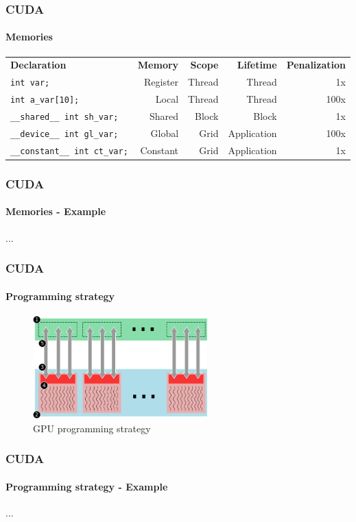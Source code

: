 \begin{frame}[fragile]
    \frametitle{CUDA}
    \framesubtitle{Memories}
    \begin{table}
    \centering
    \label{tab:memories-penalty}
    \scriptsize
    \begin{tabular}{l|r|r|r|r}
        \textbf{Declaration}  & \textbf{Memory}   & \textbf{Scope}  & \textbf{Lifetime}    & \textbf{Penalization} \\
        \texttt{int var;}                      & Register & Thread & Thread      & 1x \\
        \texttt{int a\_var[10];}            & Local    & Thread & Thread      & 100x \\
        \texttt{\_\_shared\_\_ int sh\_var;}    & Shared   & Block  & Block       & 1x \\
        \texttt{\_\_device\_\_ int gl\_var;}    & Global   & Grid   & Application & 100x \\
        \texttt{\_\_constant\_\_ int ct\_var;}& Constant & Grid   & Application & 1x 
    \end{tabular}
    \label{CUDA Memories}
    \end{table}
\end{frame}

\begin{frame}
    \frametitle{CUDA}
    \framesubtitle{Memories - Example}

    ...
\end{frame}

\begin{frame}
    \frametitle{CUDA}
    \framesubtitle{Programming strategy}
    \begin{figure}
        \centering
        \label{fig:cuda-strategy}
        \includegraphics[width=0.6\textwidth]{img/cuda-strategy}
        \caption{GPU programming strategy}
    \end{figure}
\end{frame}

\begin{frame}
    \frametitle{CUDA}
    \framesubtitle{Programming strategy - Example}
    ...
\end{frame}
